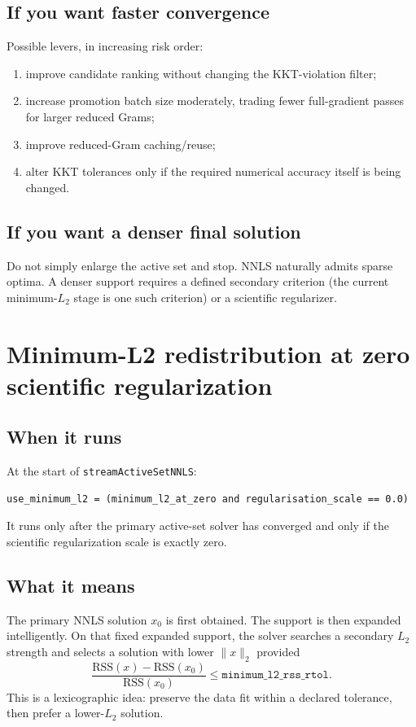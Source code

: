 \documentclass[10pt,a4paper]{article}
\newcommand{\code}[1]{\texttt{#1}}
\begin{document}
\subsection{If you want faster convergence}
Possible levers, in increasing risk order:
\begin{enumerate}
\item improve candidate ranking without changing the KKT-violation filter;
\item increase promotion batch size moderately, trading fewer full-gradient passes for larger reduced Grams;
\item improve reduced-Gram caching/reuse;
\item alter KKT tolerances only if the required numerical accuracy itself is being changed.
\end{enumerate}

\subsection{If you want a denser final solution}
Do not simply enlarge the active set and stop. NNLS naturally admits sparse optima. A denser support requires a defined secondary criterion (the current minimum-$L_2$ stage is one such criterion) or a scientific regularizer.

\section{Minimum-L2 redistribution at zero scientific regularization}
\subsection{When it runs}
At the start of \code{streamActiveSetNNLS}:
\begin{lstlisting}
use_minimum_l2 = (minimum_l2_at_zero and regularisation_scale == 0.0)
\end{lstlisting}
It runs only after the primary active-set solver has converged and only if the scientific regularization scale is exactly zero.

\subsection{What it means}
The primary NNLS solution $x_0$ is first obtained. The support is then expanded intelligently. On that fixed expanded support, the solver searches a secondary $L_2$ strength and selects a solution with lower $\lVert x\rVert_2$ provided
\[
\frac{\mathrm{RSS}(x)-\mathrm{RSS}(x_0)}{\mathrm{RSS}(x_0)}\le \texttt{minimum\_l2\_rss\_rtol}.
\]
This is a lexicographic idea: preserve the data fit within a declared tolerance, then prefer a lower-$L_2$ solution.
\end{document}
